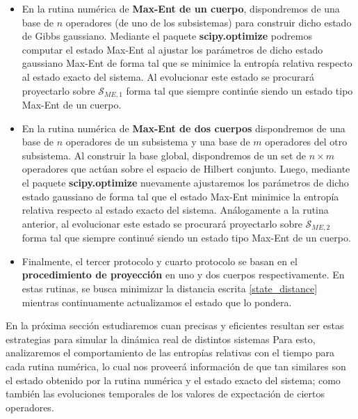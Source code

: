 \documentclass{report} %
\numberwithin{equation}{section}
\begin{document}
\begin{itemize}
    \item En la rutina numérica de \textbf{Max-Ent de un cuerpo}, dispondremos de una base de $n$ operadores (de uno de los subsistemas) para construir dicho estado de Gibbs gaussiano. Mediante el paquete \textbf{scipy.optimize} podremos computar el estado Max-Ent al ajustar los parámetros de dicho estado gaussiano Max-Ent de forma tal que se minimice la entropía relativa respecto al estado exacto del sistema. Al evolucionar este estado se procurará proyectarlo sobre $\mathcal{S}_{ME,1}$ forma tal que siempre continúe siendo un estado tipo Max-Ent de un cuerpo.
    \item En la rutina numérica de \textbf{Max-Ent de dos cuerpos} dispondremos de una base de $n$ operadores de un subsistema y una base de $m$ operadores del otro subsistema. Al construir la base global, dispondremos de un set de $n\times m$ operadores que actúan sobre el espacio de Hilbert conjunto. Luego, mediante el paquete \textbf{scipy.optimize} nuevamente ajustaremos los parámetros de dicho estado gaussiano de forma tal que el estado Max-Ent minimice la entropía relativa respecto al estado exacto del sistema. Análogamente a la rutina anterior, al evolucionar este estado se procurará proyectarlo sobre $\mathcal{S}_{ME,2}$ forma tal que siempre continué siendo un estado tipo Max-Ent de un cuerpo.
    \item Finalmente, el tercer protocolo y cuarto protocolo se basan en el \textbf{procedimiento de proyección} en uno y dos cuerpos respectivamente. En estas rutinas, se busca minimizar la distancia escrita \eqref{state_distance} mientras continuamente actualizamos el estado que lo pondera. 
    \end{itemize}

En la próxima sección estudiaremos cuan precisas y eficientes resultan ser estas estrategias para simular la dinámica real de distintos sistemas 
Para esto, analizaremos el comportamiento de las entropías relativas con el tiempo para cada rutina numérica, lo cual nos proveerá información de que tan similares son el estado obtenido por la rutina numérica y el estado exacto del sistema; como también las evoluciones temporales de los valores de expectación de ciertos operadores.

\end{document}
